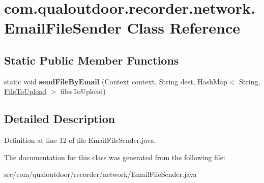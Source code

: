 \hypertarget{classcom_1_1qualoutdoor_1_1recorder_1_1network_1_1EmailFileSender}{\section{com.\-qualoutdoor.\-recorder.\-network.\-Email\-File\-Sender Class Reference}
\label{classcom_1_1qualoutdoor_1_1recorder_1_1network_1_1EmailFileSender}
}
\subsection*{Static Public Member Functions}
\begin{DoxyCompactItemize}
\item 
\hypertarget{classcom_1_1qualoutdoor_1_1recorder_1_1network_1_1EmailFileSender_a8bf39db0d24ef61c223b92ecf5688df8}{static void {\bfseries send\-File\-By\-Email} (Context context, String dest, Hash\-Map$<$ String, \hyperlink{classcom_1_1qualoutdoor_1_1recorder_1_1network_1_1FileToUpload}{File\-To\-Upload} $>$ files\-To\-Upload)}\label{classcom_1_1qualoutdoor_1_1recorder_1_1network_1_1EmailFileSender_a8bf39db0d24ef61c223b92ecf5688df8}

\end{DoxyCompactItemize}


\subsection{Detailed Description}


Definition at line 12 of file Email\-File\-Sender.\-java.



The documentation for this class was generated from the following file\-:\begin{DoxyCompactItemize}
\item 
src/com/qualoutdoor/recorder/network/Email\-File\-Sender.\-java\end{DoxyCompactItemize}
